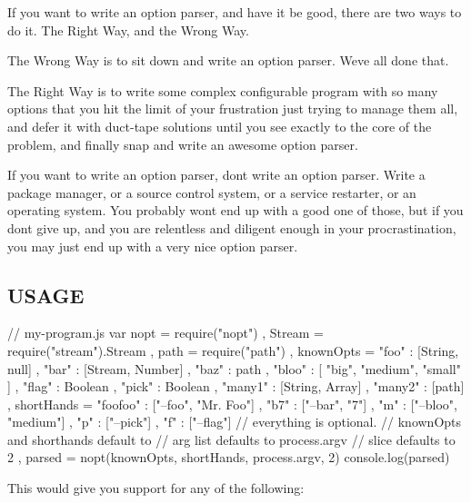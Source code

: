 If you want to write an option parser, and have it be good, there are two ways to do it. The Right Way, and the Wrong Way.

The Wrong Way is to sit down and write an option parser. We\textquotesingle{}ve all done that.

The Right Way is to write some complex configurable program with so many options that you hit the limit of your frustration just trying to manage them all, and defer it with duct-\/tape solutions until you see exactly to the core of the problem, and finally snap and write an awesome option parser.

If you want to write an option parser, don\textquotesingle{}t write an option parser. Write a package manager, or a source control system, or a service restarter, or an operating system. You probably won\textquotesingle{}t end up with a good one of those, but if you don\textquotesingle{}t give up, and you are relentless and diligent enough in your procrastination, you may just end up with a very nice option parser.

\subsection*{U\+S\+A\+G\+E}

\begin{DoxyVerb}// my-program.js
var nopt = require("nopt")
  , Stream = require("stream").Stream
  , path = require("path")
  , knownOpts = { "foo" : [String, null]
                , "bar" : [Stream, Number]
                , "baz" : path
                , "bloo" : [ "big", "medium", "small" ]
                , "flag" : Boolean
                , "pick" : Boolean
                , "many1" : [String, Array]
                , "many2" : [path]
                }
  , shortHands = { "foofoo" : ["--foo", "Mr. Foo"]
                 , "b7" : ["--bar", "7"]
                 , "m" : ["--bloo", "medium"]
                 , "p" : ["--pick"]
                 , "f" : ["--flag"]
                 }
             // everything is optional.
             // knownOpts and shorthands default to {}
             // arg list defaults to process.argv
             // slice defaults to 2
  , parsed = nopt(knownOpts, shortHands, process.argv, 2)
console.log(parsed)
\end{DoxyVerb}


This would give you support for any of the following\+:


